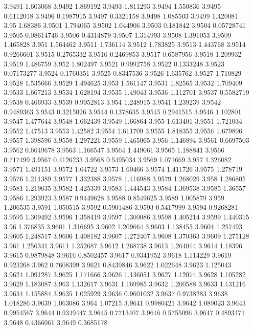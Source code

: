 3.9491  1.603068
3.9492  1.869192
3.9493  1.811293
3.9494  1.550836
3.9495  0.6112018
3.9496  0.1987915
3.9497  0.3321158
3.9498  1.085503
3.9499  1.420081
3.95  1.68386
3.9501  1.794065
3.9502  1.044906
3.9503  0.181842
3.9504  0.05728741
3.9505  0.08614746
3.9506  0.4314879
3.9507  1.314993
3.9508  1.391053
3.9509  1.465828
3.951  1.564462
3.9511  1.736114
3.9512  1.783825
3.9513  1.443768
3.9514  0.9266601
3.9515  0.2765332
3.9516  0.2469853
3.9517  0.6587956
3.9518  1.209932
3.9519  1.486759
3.952  1.802497
3.9521  0.9992758
3.9522  0.1333248
3.9523  0.07173277
3.9524  0.1760351
3.9525  0.8347536
3.9526  1.635762
3.9527  1.710829
3.9528  1.535666
3.9529  1.494625
3.953  1.561147
3.9531  1.82565
3.9532  1.709409
3.9533  1.667213
3.9534  1.628194
3.9535  1.49043
3.9536  1.112701
3.9537  0.5582719
3.9538  0.466933
3.9539  0.9052813
3.954  1.248915
3.9541  1.239239
3.9542  0.9489363
3.9543  0.3215026
3.9544  0.1378635
3.9545  0.2941515
3.9546  1.102801
3.9547  1.477644
3.9548  1.662439
3.9549  1.66864
3.955  1.613401
3.9551  1.721034
3.9552  1.47513
3.9553  1.42582
3.9554  1.611709
3.9555  1.818355
3.9556  1.679896
3.9557  1.398596
3.9558  1.297221
3.9559  1.465065
3.956  1.146894
3.9561  0.6697503
3.9562  0.6649678
3.9563  1.166547
3.9564  1.449061
3.9565  1.188841
3.9566  0.717499
3.9567  0.4126233
3.9568  0.5495034
3.9569  1.071669
3.957  1.326082
3.9571  1.491151
3.9572  1.64722
3.9573  1.60466
3.9574  1.411726
3.9575  1.278719
3.9576  1.211389
3.9577  1.332388
3.9578  1.416988
3.9579  1.268029
3.958  1.286805
3.9581  1.219635
3.9582  1.425339
3.9583  1.444543
3.9584  1.369538
3.9585  1.36557
3.9586  1.293923
3.9587  0.9449628
3.9588  0.8549625
3.9589  1.005879
3.959  1.206535
3.9591  1.050515
3.9592  0.5901486
3.9593  0.5417999
3.9594  0.9268281
3.9595  1.309492
3.9596  1.358419
3.9597  1.300086
3.9598  1.405214
3.9599  1.440315
3.96  1.376835
3.9601  1.316695
3.9602  1.209664
3.9603  1.138455
3.9604  1.257493
3.9605  1.248517
3.9606  1.408182
3.9607  1.272407
3.9608  1.370363
3.9609  1.275128
3.961  1.256341
3.9611  1.252687
3.9612  1.268738
3.9613  1.264014
3.9614  1.18396
3.9615  0.9879848
3.9616  0.8502457
3.9617  0.9341952
3.9618  1.114229
3.9619  0.923268
3.962  0.7608399
3.9621  0.8439846
3.9622  1.022648
3.9623  1.125043
3.9624  1.091287
3.9625  1.171666
3.9626  1.136051
3.9627  1.12074
3.9628  1.105282
3.9629  1.183087
3.963  1.132617
3.9631  1.169985
3.9632  1.200588
3.9633  1.131216
3.9634  1.155884
3.9635  1.025929
3.9636  0.9601032
3.9637  0.9738283
3.9638  1.018286
3.9639  1.063086
3.964  1.07215
3.9641  0.9980421
3.9642  1.089023
3.9643  0.9954567
3.9644  0.9349447
3.9645  0.7713407
3.9646  0.5755096
3.9647  0.4893171
3.9648  0.4366061
3.9649  0.3685178
